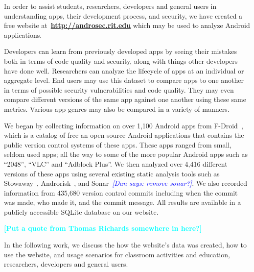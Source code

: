\documentclass[journal,transmag]{IEEEtran}
\newcommand{\todo}[1]{\textcolor{cyan}{\textbf{[#1]}}}
\newcommand{\dan}[1]{\textcolor{blue}{{\it [Dan says: #1]}}}
\begin{document}

%


 In order to assist students, researchers, developers and general users in understanding apps, their development process, and security, we have created a free website at~\textbf{\url{http://androsec.rit.edu}} which may be used to analyze Android applications.

Developers can learn from previously developed apps by seeing their mistakes both in terms of code quality and security, along with things other developers have done well. Researchers can analyze the lifecycle of apps at an individual or aggregate level. End users may use this dataset to compare apps to one another in terms of possible security vulnerabilities and code quality. They may even compare different versions of the same app against one another using these same metrics. Various app genres may also be compared in a variety of manners.

We began by collecting information on over 1,100 Android apps from F-Droid~\cite{fdroid_url}, which is a catalog of free an open source Android applications that contains the public version control systems of these apps. These apps ranged from small, seldom used apps; all the way to some of the more popular Android apps such as ``2048'', ``VLC''  and ``Adblock Plus''. We then analyzed over 4,416 different versions of these apps using several  existing static analysis tools such as Stowaway~\cite{Felt:2011:APD:2046707.2046779}, Androrisk~\cite{androguard_url}, and Sonar~\cite{sonar_qube_url}\dan{remove sonar?}. We also recorded information from 435,680 version control commits including when the commit was made, who made it, and the commit message. All results are available in a publicly accessible SQLite database on our website.


\todo{Put a quote from Thomas Richards somewhere in here?}

In the following work, we discuss the how the website's data was created, how to use the website, and usage scenarios for classroom activities and education, researchers, developers and general users.



\end{document}
